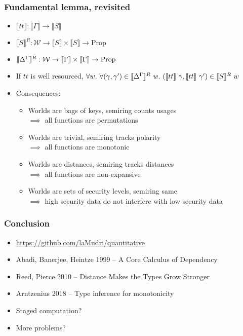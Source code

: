 \documentclass[fleqn]{beamer}
\begin{document}
  \begin{frame}
    \frametitle{Fundamental lemma, revisited}
    \begin{itemize}
    \item $\llbracket tt \rrbracket : \llbracket \Gamma \rrbracket \to
      \llbracket S \rrbracket$ \pause
    \item $\llbracket S \rrbracket^R : \mathcal{W} \to
      \llbracket S \rrbracket \times \llbracket S \rrbracket \to \mathrm{Prop}$
    \item $\llbracket {\Delta}^{\Gamma} \rrbracket^R : \mathcal{W} \to
      \llbracket \Gamma \rrbracket \times \llbracket \Gamma \rrbracket \to \mathrm{Prop}$ \pause
    \item If $tt$ is well resourced, $\forall w.~\forall(\gamma, \gamma') \in \llbracket {\Delta}^{\Gamma}
      \rrbracket^R~w.~(\llbracket tt \rrbracket~\gamma, \llbracket tt
      \rrbracket~\gamma') \in \llbracket S \rrbracket^R~w$ \pause
    \item Consequences:
      \begin{itemize}
      \item Worlds are bags of keys, semiring counts usages \\
        $\implies$ all functions are permutations
      \item Worlds are trivial, semiring tracks polarity \\
        $\implies$ all functions are monotonic \pause
      \item Worlds are distances, semiring tracks distances \\
        $\implies$ all functions are non-expansive \pause
      \item Worlds are sets of security levels, semiring same \\
        $\implies$ high security data do not interfere with low security data
      \end{itemize}
    \end{itemize}
  \end{frame}
  \begin{frame}
    \frametitle{Conclusion}
    \begin{itemize}
    \item \url{https://github.com/laMudri/quantitative} \pause
    \item Abadi, Banerjee, Heintze 1999 -- A Core Calculus of Dependency
    \item Reed, Pierce 2010 -- Distance Makes the Types Grow Stronger
    \item Arntzenius 2018 -- Type inference for monotonicity \pause
    \item Staged computation?
    \item More problems?
    \end{itemize}
  \end{frame}
\end{document}
